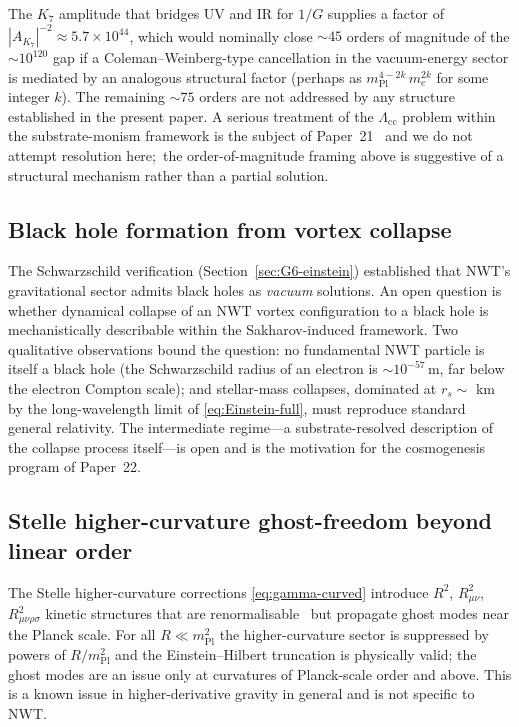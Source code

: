 \documentclass[11pt]{article}
\newcommand{\mPl}{m_{\mathrm{Pl}}}
\newcommand{\me}{m_e}
\begin{document}
The $K_7$ amplitude that bridges UV and IR for $1/G$ supplies a
factor of $|A_{K_7}|^{-2} \approx 5.7 \times 10^{44}$, which would
nominally close $\sim 45$ orders of magnitude of the
$\sim 10^{120}$ gap if a Coleman--Weinberg-type cancellation in
the vacuum-energy sector is mediated by an analogous structural
factor (perhaps as $\mPl^{4-2k}\,\me^{2k}$ for some integer $k$).
The remaining $\sim 75$ orders are not addressed by any structure
established in the present paper.  A serious treatment of the
$\Lambda_{\mathrm{cc}}$ problem within the substrate-monism
framework is the subject of Paper~21~\cite{paper19} and we do not
attempt resolution here;\ the order-of-magnitude framing above is
suggestive of a structural mechanism rather than a partial
solution.

\subsection{Black hole formation from vortex collapse}

The Schwarzschild verification (Section~\ref{sec:G6-einstein})
established that NWT's gravitational sector admits black holes as
\emph{vacuum} solutions.  An open question is whether dynamical
collapse of an NWT vortex configuration to a black hole is
mechanistically describable within the Sakharov-induced framework.
Two qualitative observations bound the question:
no fundamental NWT particle is itself a black hole (the
Schwarzschild radius of an electron is $\sim 10^{-57}\,\mathrm{m}$,
far below the electron Compton scale); and stellar-mass
collapses, dominated at $r_s \sim$ km by the long-wavelength
limit of \eqref{eq:Einstein-full}, must reproduce standard general
relativity.  The intermediate regime---a substrate-resolved
description of the collapse process itself---is open and is the
motivation for the cosmogenesis program of Paper~22.

\subsection{Stelle higher-curvature ghost-freedom beyond linear order}

The Stelle higher-curvature corrections \eqref{eq:gamma-curved}
introduce $R^2$, $R_{\mu\nu}^2$, $R_{\mu\nu\rho\sigma}^2$ kinetic
structures that are renormalisable~\cite{stelle1977} but propagate
ghost modes near the Planck scale.  For all $R \ll \mPl^2$ the
higher-curvature sector is suppressed by powers of $R/\mPl^2$ and
the Einstein--Hilbert truncation is physically valid; the ghost
modes are an issue only at curvatures of Planck-scale order and
above.  This is a known issue in higher-derivative gravity in
general and is not specific to NWT.
\end{document}

